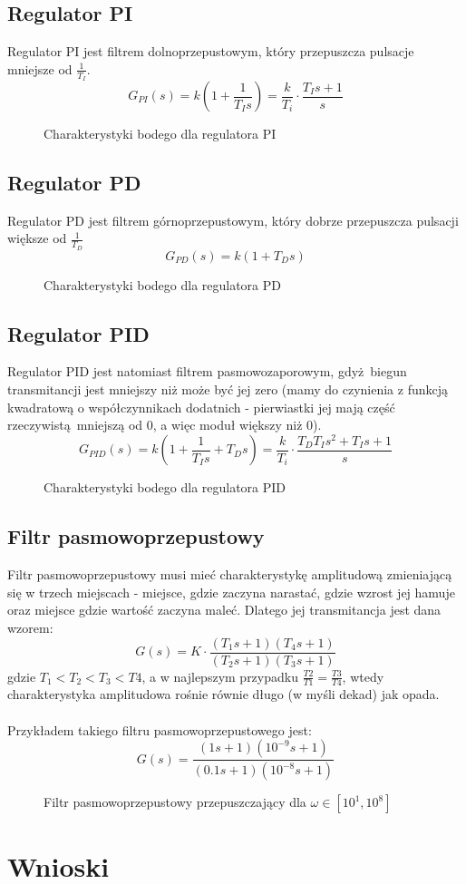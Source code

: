 \documentclass[a4paper, 10pt]{article}
\begin{document}
		\subsection{Regulator PI}
			Regulator PI jest filtrem dolnoprzepustowym, który przepuszcza pulsacje mniejsze od $\frac{1}{T_I}$.
			$$
				G_{PI}(s) = k\left(1 + \frac{1}{T_Is}\right) = \frac{k}{T_i} \cdot\frac{T_Is + 1}{s}
			$$
			\begin{figure}[H]
				\centering
				\def \svgwidth{0.7\columnwidth}
				
				\caption{Charakterystyki bodego dla regulatora PI}
			\end{figure}\noindent
		\subsection{Regulator PD}
			Regulator PD jest filtrem górnoprzepustowym, który dobrze przepuszcza pulsacji większe od $ \frac{1}{T_D}$
			$$
				G_{PD}(s) = k\left(1 + T_Ds\right)
			$$
			\begin{figure}[H]
				\centering
				\def \svgwidth{0.7\columnwidth}
				
				\caption{Charakterystyki bodego dla regulatora PD}
			\end{figure}\noindent
		\subsection{Regulator PID}
			Regulator PID jest natomiast filtrem pasmowozaporowym, gdyż biegun transmitancji jest mniejszy niż może być jej zero (mamy do czynienia z funkcją kwadratową o współczynnikach dodatnich - pierwiastki jej mają część rzeczywistą mniejszą od 0, a więc moduł większy niż 0). 
			$$
				G_{PID}(s) = k\left(1 + \frac{1}{T_Is} + T_Ds\right) = \frac{k}{T_i}
					\cdot \frac{T_DT_Is^2 + T_Is + 1}{s}
			$$
			\begin{figure}[H]
				\centering
				\def \svgwidth{0.7\columnwidth}
				
				\caption{Charakterystyki bodego dla regulatora PID}
			\end{figure}\noindent
		\subsection{Filtr pasmowoprzepustowy}
			Filtr pasmowoprzepustowy musi mieć charakterystykę amplitudową zmieniającą się w trzech miejscach - miejsce, gdzie zaczyna narastać, gdzie wzrost jej hamuje oraz miejsce gdzie wartość zaczyna maleć. Dlatego jej transmitancja jest dana wzorem:
			$$
				G(s) = K\cdot\frac{(T_1 s + 1)(T_4 s + 1)}{(T_2 s + 1)(T_3 s + 1)}
			$$
			gdzie $T_1 < T_2 < T_3 < T4$, a w najlepszym przypadku $\frac{T2}{T1} = \frac{T3}{T4}$, wtedy charakterystyka amplitudowa rośnie równie długo (w myśli dekad) jak opada.
			\\ \\
			Przykładem takiego filtru pasmowoprzepustowego jest:
			$$
				G(s) = \frac{(1 s + 1)(10^{-9} s + 1)}{(0.1 s + 1)(10^{-8} s + 1)}
			$$
			\begin{figure}[H]
				\centering
				\def \svgwidth{0.7\columnwidth}
				
				\caption{Filtr pasmowoprzepustowy przepuszczający dla $\omega \in [10^1, 10^8]$}
			\end{figure}\noindent
	\section{Wnioski}
		
\end{document}
